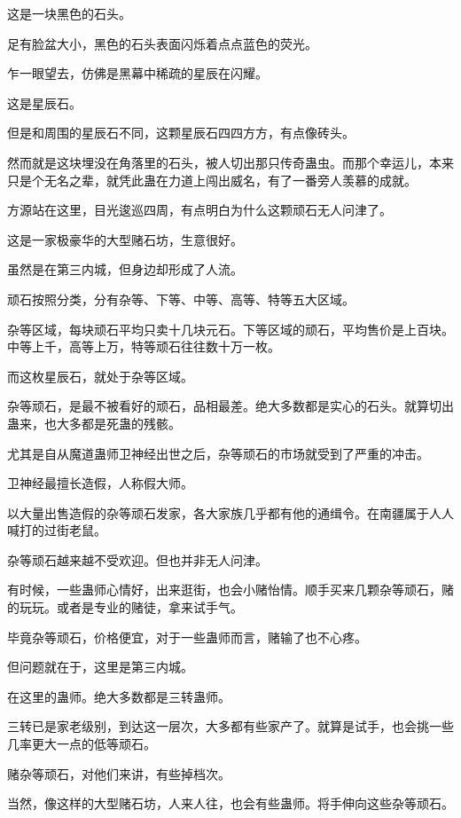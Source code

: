 
\begin{this_body}

这是一块黑色的石头。

足有脸盆大小，黑色的石头表面闪烁着点点蓝色的荧光。

乍一眼望去，仿佛是黑幕中稀疏的星辰在闪耀。

这是星辰石。

但是和周围的星辰石不同，这颗星辰石四四方方，有点像砖头。

然而就是这块埋没在角落里的石头，被人切出那只传奇蛊虫。而那个幸运儿，本来只是个无名之辈，就凭此蛊在力道上闯出威名，有了一番旁人羡慕的成就。

方源站在这里，目光逡巡四周，有点明白为什么这颗顽石无人问津了。

这是一家极豪华的大型赌石坊，生意很好。

虽然是在第三内城，但身边却形成了人流。

顽石按照分类，分有杂等、下等、中等、高等、特等五大区域。

杂等区域，每块顽石平均只卖十几块元石。下等区域的顽石，平均售价是上百块。中等上千，高等上万，特等顽石往往数十万一枚。

而这枚星辰石，就处于杂等区域。

杂等顽石，是最不被看好的顽石，品相最差。绝大多数都是实心的石头。就算切出蛊来，也大多都是死蛊的残骸。

尤其是自从魔道蛊师卫神经出世之后，杂等顽石的市场就受到了严重的冲击。

卫神经最擅长造假，人称假大师。

以大量出售造假的杂等顽石发家，各大家族几乎都有他的通缉令。在南疆属于人人喊打的过街老鼠。

杂等顽石越来越不受欢迎。但也并非无人问津。

有时候，一些蛊师心情好，出来逛街，也会小赌怡情。顺手买来几颗杂等顽石，赌的玩玩。或者是专业的赌徒，拿来试手气。

毕竟杂等顽石，价格便宜，对于一些蛊师而言，赌输了也不心疼。

但问题就在于，这里是第三内城。

在这里的蛊师。绝大多数都是三转蛊师。

三转已是家老级别，到达这一层次，大多都有些家产了。就算是试手，也会挑一些几率更大一点的低等顽石。

赌杂等顽石，对他们来讲，有些掉档次。

当然，像这样的大型赌石坊，人来人往，也会有些蛊师。将手伸向这些杂等顽石。


\end{this_body}
